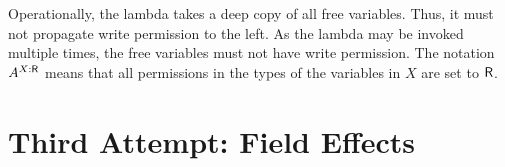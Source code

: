 \documentclass{llncs}
\begin{document}
\begin{mathpar}

  




\end{mathpar}

Operationally, the lambda takes a deep copy of all free variables.
Thus, it must not propagate write permission to the left.
As the lambda may be invoked multiple times, the free variables must
not have write permission.
The notation $A^{X:\READ}$ means that all permissions in the types of the
variables in $X$ are set to $\READ$.

\clearpage{}

\section{Third Attempt: Field Effects}
\label{sec:third-attempt:-field}
\end{document}
